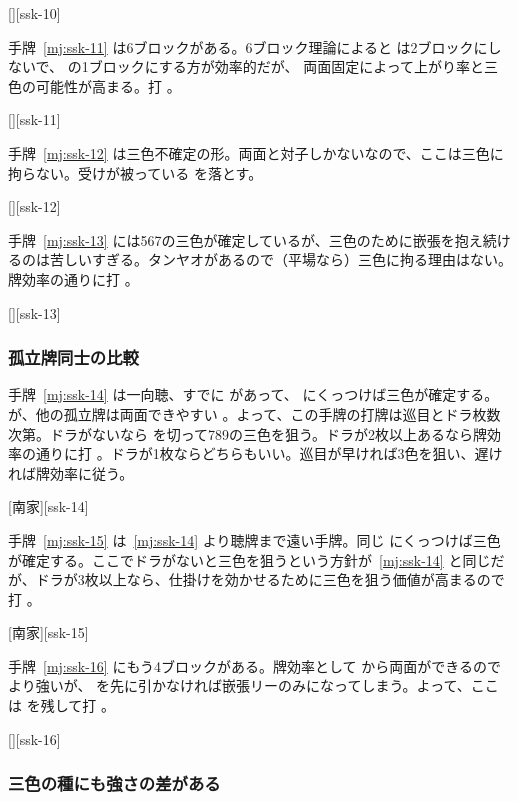 \documentclass[../nankiru_main.tex]{subfiles}
\begin{document}
[][ssk-10]

手牌~\ref{mj:ssk-11} は6ブロックがある。6ブロック理論によると  は2ブロックにしないで、 の1ブロックにする方が効率的だが、 両面固定によって上がり率と三色の可能性が高まる。打  \citep[][p.~65]{zero-teyaku}。

[][ssk-11]

手牌~\ref{mj:ssk-12} は三色不確定の形。両面と対子しかないなので、ここは三色に拘らない。受けが被っている  を落とす\citep{gendai-ssk}。

[][ssk-12]

手牌~\ref{mj:ssk-13} には567の三色が確定しているが、三色のために嵌張を抱え続けるのは苦しいすぎる。タンヤオがあるので（平場なら）三色に拘る理由はない。牌効率の通りに打  \citep{gendai-ssk}。

[][ssk-13]


\subsubsection*{孤立牌同士の比較}

手牌~\ref{mj:ssk-14} は一向聴、すでに  があって、 にくっつけば三色が確定する。が、他の孤立牌は両面できやすい 。よって、この手牌の打牌は巡目とドラ枚数次第。ドラがないなら  を切って789の三色を狙う。ドラが2枚以上あるなら牌効率の通りに打 。ドラが1枚ならどちらもいい。巡目が早ければ3色を狙い、遅ければ牌効率に従う\citep{yoteru-ssk}。

[南家][ssk-14]

手牌~\ref{mj:ssk-15} は~\ref{mj:ssk-14} より聴牌まで遠い手牌。同じ  にくっつけば三色が確定する。ここでドラがないと三色を狙うという方針が~\ref{mj:ssk-14} と同じだが、ドラが3枚以上なら、仕掛けを効かせるために三色を狙う価値が高まるので打  \citep{yoteru-ssk}。

[南家][ssk-15]

手牌~\ref{mj:ssk-16} にもう4ブロックがある。牌効率として  から両面ができるので  より強いが、 を先に引かなければ嵌張リーのみになってしまう。よって、ここは  を残して打  \citep{gendai-ssk}。

[][ssk-16]


\subsubsection*{三色の種にも強さの差がある}
\end{document}
